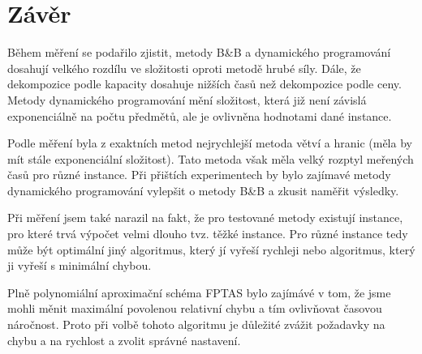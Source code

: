 \documentclass[11pt]{article}
\begin{document}
\section{Závěr}
Během měření se podařilo zjistit, metody B\&B a dynamického programování dosahují velkého rozdílu ve složitosti oproti metodě hrubé síly. Dále, že dekompozice podle kapacity dosahuje nižších časů než dekompozice podle ceny. Metody dynamického programování mění složitost, která již není závislá exponenciálně na počtu předmětů, ale je ovlivněna hodnotami dané instance.

 Podle měření byla z exaktních metod nejrychlejší metoda větví a hranic (měla by mít stále exponenciální složitost). Tato metoda však měla velký rozptyl meřených časů pro různé instance. Při přištích experimentech by bylo zajímavé metody dynamického programování vylepšit o metody B\&B a zkusit naměřit výsledky.

Při měření jsem také narazil na fakt, že pro testované metody existují instance, pro které trvá výpočet velmi dlouho tvz. těžké instance. Pro různé instance tedy může být optimální jiný algoritmus, který jí vyřeší rychleji nebo algoritmus, který ji vyřeší s minimální chybou.

Plně polynomiální aproximační schéma FPTAS bylo zajímávé v tom, že jsme mohli měnit maximální povolenou relativní chybu a tím ovlivňovat časovou náročnost. Proto při volbě tohoto algoritmu je důležité zvážit požadavky na chybu a na rychlost a zvolit správné nastavení.
\end{document}
